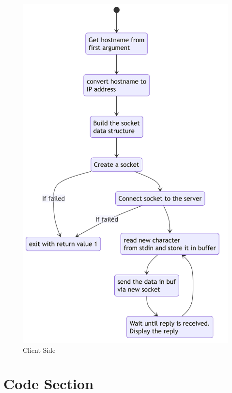 \documentclass[a4paper,12pt]{article}
\begin{document}

\begin{figure}[H]
    \centering
    \includegraphics[width=0.9\linewidth]{client-side.pdf}
    \caption{Client Side}
\end{figure}


\newpage
\section{Code Section}

\vspace{5mm}
\end{document}

